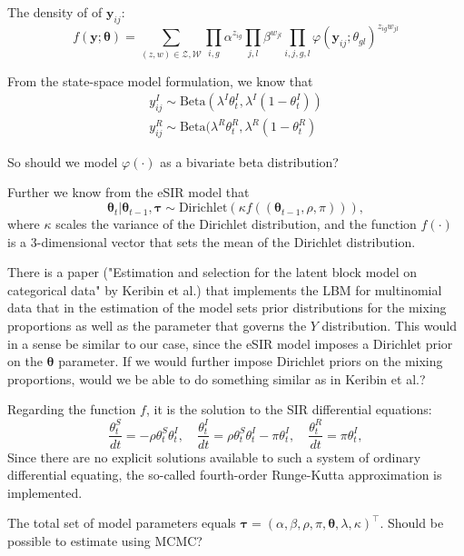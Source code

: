 \documentclass[10pt,a4paper]{article}
\begin{document}
The density of of $\mathbf{y}_{ij}$:
$$
f(\mathbf{y}; \boldsymbol{\theta}) = \sum_{(z, w) \in \mathcal{Z}, \mathcal{W}} \prod_{i, g} \alpha^{z_{ig}} \prod_{j, l} \beta^{w_{jl}} \prod_{i, j, g, l} \varphi(\mathbf{y}_{ij}; \theta_{gl})^{z_{ig} w_{jl}}
$$

From the state-space model formulation, we know that 
\begin{align*}
	y_{ij}^I \sim \text{Beta}(\lambda^I \theta_t^I, \lambda^I(1 - \theta_t^I)) \\
	y_{ij}^R \sim \text{Beta}(\lambda^R \theta_t^R, \lambda^R(1 - \theta_t^R)
\end{align*}

So should we model $\varphi(\cdot)$ as a bivariate beta distribution?

Further we know from the eSIR model that 
$$
\boldsymbol{\theta}_t | \boldsymbol{\theta}_{t-1}, \boldsymbol{\tau} \sim \text{Dirichlet}(\kappa f((\boldsymbol{\theta}_{t-1}, \rho, \pi))),
$$
where $\kappa$ scales the variance of the Dirichlet distribution, and the function $f(\cdot)$ is a 3-dimensional vector that sets the mean of the Dirichlet distribution.

There is a paper ("Estimation and selection for the latent block model on categorical data" by Keribin et al.) that implements the LBM for multinomial data that in the estimation of the model sets prior distributions for the mixing proportions as well as the parameter that governs the $Y$ distribution. This would in a sense be similar to our case, since the eSIR model imposes a Dirichlet prior on the $\boldsymbol{\theta}$ parameter. If we would further impose Dirichlet priors on the mixing proportions, would we be able to do something similar as in Keribin et al.?

Regarding the function $f$, it is the solution to the SIR differential equations:
$$
\frac{\theta_t^S}{dt} = -\rho\theta_t^S\theta_t^I, \quad \frac{\theta_t^I}{dt} = \rho\theta_t^S\theta_t^I - \pi \theta_t^I, \quad \frac{\theta_t^R}{dt} = \pi \theta_t^I,
$$
Since there are no explicit solutions available to such a system of ordinary differential equating, the so-called fourth-order Runge-Kutta approximation is implemented.

The total set of model parameters equals $\boldsymbol{\tau} = (\alpha, \beta, \rho, \pi, \mathbf{\theta}, \lambda, \kappa)^\top$. Should be possible to estimate using MCMC?
\end{document}
